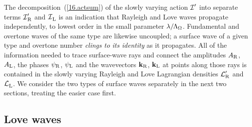 The decomposition~(\ref{16.actsum}) of the slowly
varying action $\mbox{$\cal I$}'$ into separate terms $\mbox{$\cal I$}'_{\rm R}$ and
$\sI_{\raisebox{-0.2 ex}{\scriptsize\rm L}}$ is an indication
that Rayleigh and Love waves propagate independently,
to lowest order in the small parameter
$\lambda/\hspace{-0.3 mm}\Lambda_{\Omega}$.
Fundamental and overtone waves of the same type are likewise
uncoupled; a surface wave of a given type and overtone number
{\em clings to its identity\/} as it propagates.
All of the information needed to trace surface-wave rays and
connect the amplitudes $A_{\rm R}$, $A_{\rm L}$, the phases
$\psi_{\rm R}$, $\psi_{\rm L}$ and the wavevectors
$\mbox{${\bf k}$}_{\rm R}$, $\mbox{${\bf k}$}_{\rm L}$ at points along
those rays is contained in the slowly varying Rayleigh
and Love Lagrangian densities $\mbox{$\cal L$}'_{\rm R}$ and
$\sL_{\raisebox{-0.2 ex}{\scriptsize\rm L}}$.
We consider the two types of surface waves separately in the
next two sections, treating the easier case first.

\subsection{Love waves}

